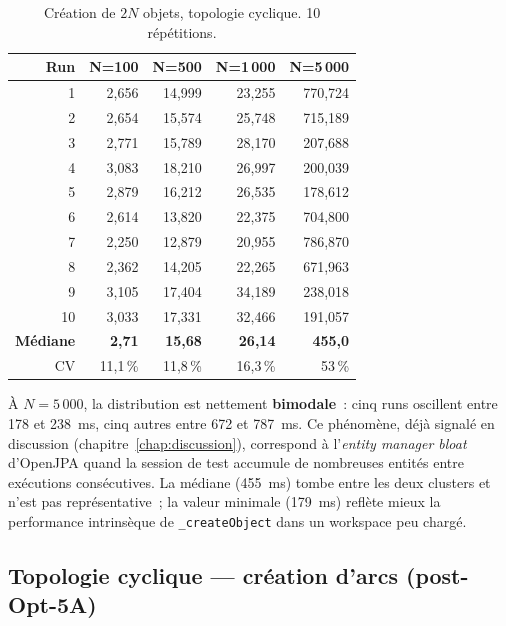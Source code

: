 \begin{table}[h]
\centering
\caption{Création de $2N$ objets, topologie cyclique. 10 répétitions.}
\begin{tabular}{rrrrr}
\hline
\textbf{Run} & \textbf{N=100} & \textbf{N=500} & \textbf{N=1\,000} & \textbf{N=5\,000} \\
\hline
1  & 2,656 & 14,999 & 23,255 & 770,724 \\
2  & 2,654 & 15,574 & 25,748 & 715,189 \\
3  & 2,771 & 15,789 & 28,170 & 207,688 \\
4  & 3,083 & 18,210 & 26,997 & 200,039 \\
5  & 2,879 & 16,212 & 26,535 & 178,612 \\
6  & 2,614 & 13,820 & 22,375 & 704,800 \\
7  & 2,250 & 12,879 & 20,955 & 786,870 \\
8  & 2,362 & 14,205 & 22,265 & 671,963 \\
9  & 3,105 & 17,404 & 34,189 & 238,018 \\
10 & 3,033 & 17,331 & 32,466 & 191,057 \\
\hline
\textbf{Médiane} & \textbf{2,71} & \textbf{15,68} & \textbf{26,14} & \textbf{455,0} \\
CV               & 11,1\,\%      & 11,8\,\%       & 16,3\,\%       & 53\,\% \\
\hline
\end{tabular}
\end{table}

À $N=5\,000$, la distribution est nettement \textbf{bimodale}~: cinq runs
oscillent entre 178 et 238~ms, cinq autres entre 672 et 787~ms. Ce
phénomène, déjà signalé en discussion (chapitre~\ref{chap:discussion}),
correspond à l'\emph{entity manager bloat} d'OpenJPA quand la session
de test accumule de nombreuses entités entre exécutions consécutives.
La médiane (455~ms) tombe entre les deux clusters et n'est pas
représentative~; la valeur minimale (179~ms) reflète mieux la
performance intrinsèque de \texttt{\_createObject} dans un workspace peu
chargé.

\subsection*{Topologie cyclique --- création d'arcs (post-Opt-5A)}

